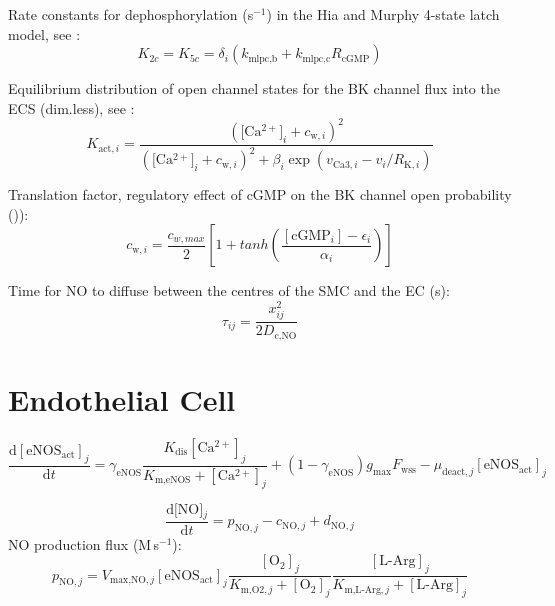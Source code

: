 \documentclass[fleqn]{report}
\numberwithin{equation}{section}
\numberwithin{equation}{section}
\newcommand{\eNOSact}{\text{eNOS$_{\text{act}}$}}
\newcommand{\LArg}{\text{L-Arg}}
\newcommand{\Otwo}{\text{O$_2$}}
\newcommand{\Ca}{\text{Ca$^{2+}$}}
\newcommand{\Cai}{\text{[Ca$^{2+}]_i$}}
\newcommand{\NOj}{\text{[NO]$_j$}}
\newcommand{\uMpers}{\textmu M\,s$^{-1}$}
\newcommand{\n}{$^{-1}$}
\newcommand\pNO[1]{\text{$p_{\text{NO},#1}$}}
\newcommand\cNO[1]{\text{$c_{\text{NO},#1}$}}
\newcommand\dNO[1]{\text{$d_{\text{NO},#1}$}}
\begin{document}
					Rate constants for dephosphorylation (s\n ) in the Hia and Murphy 4-state latch model, see \citet{Dormanns2016b}:
					\begin{equation} 
						K_{2c} = K_{5c} = \delta_i \left(k_{\text{mlpc,b}} + k_{\text{mlpc,c}} R_{\text{cGMP}}\right)
					\end{equation}	
			
				Equilibrium distribution of open channel states for the BK channel flux into the ECS  (dim.less), see \citet{Dormanns2014}:  %
							\begin{equation} 
								K_{\text{act},i} = \frac{(\Cai + c_{\text{w},i})^2}{(\Cai + c_{\text{w},i})^2 + \beta_i \exp(v_{\text{Ca}3,i} - v_i/R_{\text{K},i} )}
							\end{equation}
							
							Translation factor, regulatory effect of cGMP on the BK channel open probability (\uM)):			
							\begin{equation} 
								c_{\text{w},i} = \frac{c_{w,max}}{2}[1 + tanh( \frac{[\text{cGMP}_i]-\epsilon_i}{\alpha_i})]
							\end{equation}
							
							Time for NO to diffuse between the centres of the SMC and the EC (s):
							\begin{equation}
								\tau_{ij} = \frac{x_{ij}^2}{2 D_{\text{c,NO}}}
							\end{equation}

									

\section{Endothelial Cell}
	\begin{equation} 
					\dfrac{\mathrm{d}[\eNOSact]_j}{\mathrm{d}t} = \gamma_{\text{eNOS}} \frac{K_{\text{dis}}[\Ca]_j}{K_{\text{m,eNOS}}+[\Ca]_j} + (1-\gamma_{\text{eNOS}}) g_{\max} F_{\text{wss}}   - \mu_{\text{deact},j}[\eNOSact]_j
				\end{equation}	
						
				\begin{equation} 
					\dfrac{\mathrm{d}\NOj}{\mathrm{d}t} = \pNO{j} - \cNO{j} + \dNO{j} 
				\end{equation}
				NO production flux (\uMpers):
				\begin{equation} 
					\pNO{j} = V_{\text{max,NO},j} [\eNOSact]_j  \frac{[\Otwo]_j}{K_{\text{m,O2},j}+[\Otwo]_j} \frac{[\LArg]_j}{K_{\text{m,L-Arg},j}+[\LArg]_j}
				\end{equation}	
				
\end{document}

